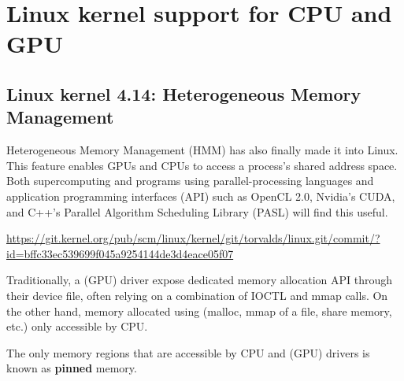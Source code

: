 \chapter{Linux kernel support for CPU and GPU}

\section{Linux kernel 4.14: Heterogeneous Memory Management}
\label{sec:HMM-shared-memory-space-GPU-CPU}

Heterogeneous Memory Management (HMM) has also finally made it into Linux. This
feature enables GPUs and CPUs to access a process's shared address space. Both
supercomputing and programs using parallel-processing languages and application
programming interfaces (API) such as OpenCL 2.0, Nvidia's CUDA, and C++'s
Parallel Algorithm Scheduling Library (PASL) will find this useful.

\url{https://git.kernel.org/pub/scm/linux/kernel/git/torvalds/linux.git/commit/?id=bffc33ec539699f045a9254144de3d4eace05f07}

Traditionally, a (GPU) driver expose dedicated memory allocation API through
their device file, often relying on a combination of IOCTL and mmap calls.
On the other hand, memory allocated using (malloc, mmap of a file, share memory,
etc.) only accessible by CPU. 

The only memory regions that are accessible by CPU and (GPU) drivers is known as
{\bf pinned} memory. 

